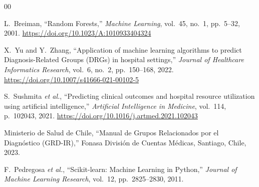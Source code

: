 \documentclass{IEEEtran}
\begin{document}
\begin{thebibliography}{00}

L.~Breiman, ``Random Forests,'' \textit{Machine Learning}, vol.~45, no.~1, pp.~5--32, 2001. \url{https://doi.org/10.1023/A:1010933404324}

X.~Yu and Y.~Zhang, ``Application of machine learning algorithms to predict Diagnosis-Related Groups (DRGs) in hospital settings,'' \textit{Journal of Healthcare Informatics Research}, vol.~6, no.~2, pp.~150--168, 2022. \url{https://doi.org/10.1007/s41666-021-00102-5}

S.~Sushmita \textit{et al.}, ``Predicting clinical outcomes and hospital resource utilization using artificial intelligence,'' \textit{Artificial Intelligence in Medicine}, vol.~114, p.~102043, 2021. \url{https://doi.org/10.1016/j.artmed.2021.102043}

Ministerio de Salud de Chile, ``Manual de Grupos Relacionados por el Diagn\'ostico (GRD-IR),'' Fonasa Divisi\'on de Cuentas M\'edicas, Santiago, Chile, 2023.

F.~Pedregosa \textit{et al.}, ``Scikit-learn: Machine Learning in Python,'' \textit{Journal of Machine Learning Research}, vol.~12, pp.~2825--2830, 2011.

\end{thebibliography}
\end{document}
